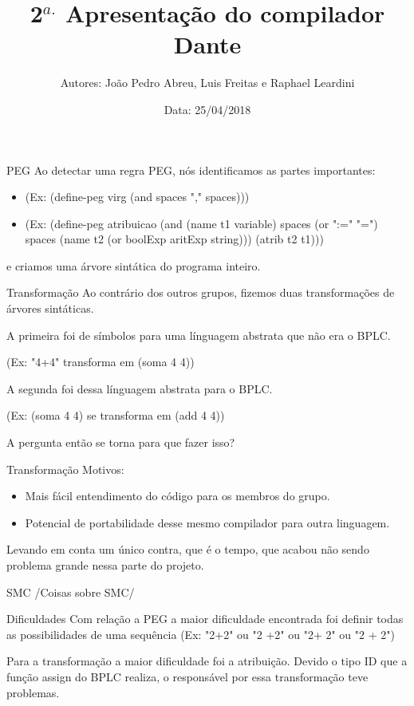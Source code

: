 \documentclass{beamer}
\title[Compiladores 2018.1]{2$^{a.}$ Apresentação do compilador Dante}
\author[Abrev.]{Autores: João Pedro Abreu, Luis Freitas e Raphael Leardini}
\institute[UFF]{Universidade Federal Fluminense}
\date{Data: 25/04/2018}
\begin{document}

\begin{frame}[plain]

\titlepage

\end{frame}


\begin{frame}{PEG}
Ao detectar uma regra PEG, nós identificamos as partes importantes:
\begin{itemize}
	\item (Ex: (define-peg virg (and spaces "," spaces)))
	\item (Ex: (define-peg atribuicao (and (name t1 variable) spaces (or ":=" "=") spaces (name t2 (or boolExp aritExp string))) (atrib t2 t1))) 
\end{itemize}
e criamos uma árvore sintática do programa inteiro.
\end{frame}


\begin{frame}{Transformação}
Ao contrário dos outros grupos, fizemos duas transformações de árvores sintáticas.

A primeira foi de símbolos para uma línguagem abstrata que não era o BPLC.

(Ex: "4+4" transforma em (soma 4 4))

A segunda foi dessa línguagem abstrata para o BPLC.

(Ex: (soma 4 4) se transforma em (add 4 4))

A pergunta então se torna para que fazer isso?

\end{frame}

\begin{frame}{Transformação}
Motivos:
\begin{itemize}

   \item Mais fácil entendimento do código para os membros do grupo.
   \item Potencial de portabilidade desse mesmo compilador para outra linguagem.
   
\end{itemize}
Levando em conta um único contra, que é o tempo, que acabou não sendo problema grande nessa parte do projeto.
\end{frame}

\begin{frame}{SMC}
/Coisas sobre SMC/



\end{frame}

\begin{frame}{Dificuldades}
Com relação a PEG a maior dificuldade encontrada foi definir todas as possibilidades de uma sequência (Ex: "2+2" ou 
"2 +2" ou "2+ 2" ou "2 + 2")

Para a transformação a maior dificuldade foi a atribuição. Devido o tipo ID que a função assign do BPLC realiza, o responsável por essa transformação teve problemas.

\end{frame}
\end{document}
